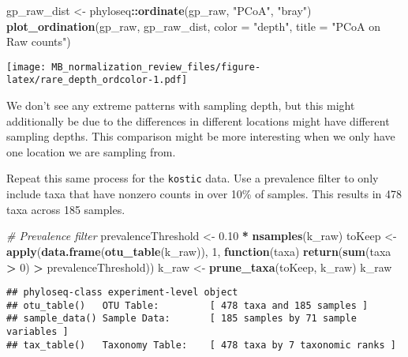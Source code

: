 \documentclass[
]{book}
\newenvironment{Shaded}{\begin{snugshade}}{\end{snugshade}}
\newcommand{\CommentTok}[1]{\textcolor[rgb]{0.56,0.35,0.01}{\textit{#1}}}
\newcommand{\ControlFlowTok}[1]{\textcolor[rgb]{0.13,0.29,0.53}{\textbf{#1}}}
\newcommand{\DataTypeTok}[1]{\textcolor[rgb]{0.13,0.29,0.53}{#1}}
\newcommand{\DecValTok}[1]{\textcolor[rgb]{0.00,0.00,0.81}{#1}}
\newcommand{\FloatTok}[1]{\textcolor[rgb]{0.00,0.00,0.81}{#1}}
\newcommand{\KeywordTok}[1]{\textcolor[rgb]{0.13,0.29,0.53}{\textbf{#1}}}
\newcommand{\NormalTok}[1]{#1}
\newcommand{\OperatorTok}[1]{\textcolor[rgb]{0.81,0.36,0.00}{\textbf{#1}}}
\newcommand{\StringTok}[1]{\textcolor[rgb]{0.31,0.60,0.02}{#1}}
\begin{document}
\begin{Shaded}
\begin{Highlighting}[]
\NormalTok{gp\_raw\_dist \textless{}{-}}\StringTok{ }\NormalTok{phyloseq}\OperatorTok{::}\KeywordTok{ordinate}\NormalTok{(gp\_raw, }\StringTok{"PCoA"}\NormalTok{, }\StringTok{"bray"}\NormalTok{)}
\KeywordTok{plot\_ordination}\NormalTok{(gp\_raw,}
\NormalTok{                gp\_raw\_dist,}
                \DataTypeTok{color =} \StringTok{"depth"}\NormalTok{, }
                \DataTypeTok{title =} \StringTok{"PCoA on Raw counts"}\NormalTok{)}
\end{Highlighting}
\end{Shaded}

\texttt{[image: MB\_normalization\_review\_files/figure-latex/rare\_depth\_ordcolor-1.pdf]}

We don't see any extreme patterns with sampling depth, but this might additionally be due to the differences in different locations might have different sampling depths. This comparison might be more interesting when we only have one location we are sampling from.

Repeat this same process for the \texttt{kostic} data. Use a prevalence filter to only include taxa that have nonzero counts in over 10\% of samples. This results in 478 taxa across 185 samples.

\begin{Shaded}
\begin{Highlighting}[]
\CommentTok{\# Prevalence filter}
\NormalTok{prevalenceThreshold \textless{}{-}}\StringTok{ }\FloatTok{0.10} \OperatorTok{*}\StringTok{ }\KeywordTok{nsamples}\NormalTok{(k\_raw)}
\NormalTok{toKeep \textless{}{-}}\StringTok{ }\KeywordTok{apply}\NormalTok{(}\KeywordTok{data.frame}\NormalTok{(}\KeywordTok{otu\_table}\NormalTok{(k\_raw)), }\DecValTok{1}\NormalTok{, }\ControlFlowTok{function}\NormalTok{(taxa)}
    \KeywordTok{return}\NormalTok{(}\KeywordTok{sum}\NormalTok{(taxa }\OperatorTok{\textgreater{}}\StringTok{ }\DecValTok{0}\NormalTok{) }\OperatorTok{\textgreater{}}\StringTok{ }\NormalTok{prevalenceThreshold))}
\NormalTok{k\_raw \textless{}{-}}\StringTok{ }\KeywordTok{prune\_taxa}\NormalTok{(toKeep, k\_raw)}
\NormalTok{k\_raw}
\end{Highlighting}
\end{Shaded}

\begin{verbatim}
## phyloseq-class experiment-level object
## otu_table()   OTU Table:         [ 478 taxa and 185 samples ]
## sample_data() Sample Data:       [ 185 samples by 71 sample variables ]
## tax_table()   Taxonomy Table:    [ 478 taxa by 7 taxonomic ranks ]
\end{verbatim}
\end{document}
